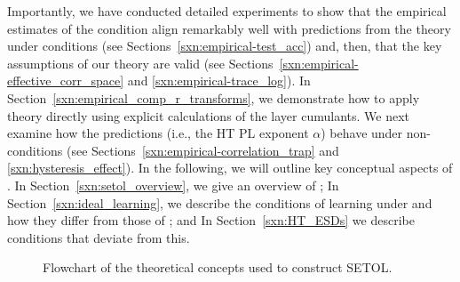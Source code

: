 Importantly, we have conducted detailed experiments to show 
that the empirical estimates of the \SETOL \TRACELOG condition align remarkably well with predictions from the \HTSR
theory under \Ideal conditions (see Sections~\ref{sxn:empirical-test_acc}) and, then, 
that the key assumptions of our \SETOL theory are valid
(see Sections~\ref{sxn:empirical-effective_corr_space} and \ref{sxn:empirical-trace_log}).
In Section~\ref{sxn:empirical_comp_r_transforms}, we demonstrate how to apply theory directly using explicit calculations of the \RMT layer cumulants.
We next examine how the \HTSR predictions (i.e., the HT PL exponent $\alpha$) behave under non-\Ideal conditions (see Sections~\ref{sxn:empirical-correlation_trap} and \ref{sxn:hysteresis_effect}).
%
In the following, we will outline key conceptual aspects of \SETOL.
In Section~\ref{sxn:setol_overview}, we give an overview of \SETOL;
In Section~\ref{sxn:ideal_learning}, we describe the conditions of \Ideal learning under \SETOL and how they differ from those of \HTSR; and
In Section~\ref{sxn:HT_ESDs} we describe conditions that deviate from this.

\begin{figure}[htbp]                 %
  \centering
  \scalebox{0.75}{}   %

  \caption{Flowchart of the theoretical concepts used to construct SETOL.}
  \label{fig:cetl-flow}
\end{figure}



